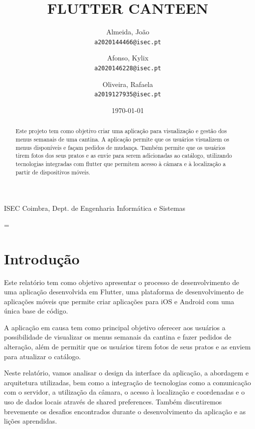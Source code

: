 \documentclass[10pt]{article}
\title{\renewcommand{\baselinestretch}{1.17}\normalsize\bf%
\uppercase{Flutter Canteen}
}
\author{%
  Almeida, João\\
  \texttt{a2020144466@isec.pt}
  \and
  Afonso, Kylix\\
  \texttt{a2020146228@isec.pt}
  \and
  Oliveira, Rafaela\\
  \texttt{a2019127935@isec.pt}
}
\begin{document}
\date{\today}

\maketitle

\vspace{-0.5cm}

\begin{center}
{\footnotesize 
ISEC Coimbra, Dept. de Engenharia Informática e Sistemas \\
}
\end{center}

\bigskip
\noindent
\begin{abstract}
    Este projeto tem como objetivo criar uma aplicação para visualização e gestão dos menus semanais de uma cantina. A aplicação permite que os usuários visualizem os menus disponíveis e façam pedidos de mudança. Também permite que os usuários tirem fotos dos seus pratos e as envie para serem adicionadas ao catálogo, utilizando tecnologias integradas com flutter que permitem acesso à câmara e à localização a partir de dispositivos móveis.
\end{abstract}

\medskip
\noindent

\baselineskip=\normalbaselineskip

\pagebreak
\tableofcontents
\pagebreak

\section{Introdução}\label{sec:1}

Este relatório tem como objetivo apresentar o processo de desenvolvimento de uma aplicação desenvolvida em Flutter, uma plataforma de desenvolvimento de aplicações móveis que permite criar aplicações para iOS e Android com uma única base de código. 

A aplicação em causa tem como principal objetivo oferecer aos usuários a possibilidade de visualizar os menus semanais da cantina e fazer pedidos de alteração, além de permitir que os usuários tirem fotos de seus pratos e as enviem para atualizar o catálogo. 

Neste relatório, vamos analisar o design da interface da aplicação, a abordagem e arquitetura utilizadas, bem como a integração de tecnologias como a comunicação com o servidor, a utilização da câmara, o acesso à localização e coordenadas e o uso de dados locais através de shared preferences. Também discutiremos brevemente os desafios encontrados durante o desenvolvimento da aplicação e as lições aprendidas.
\end{document}
